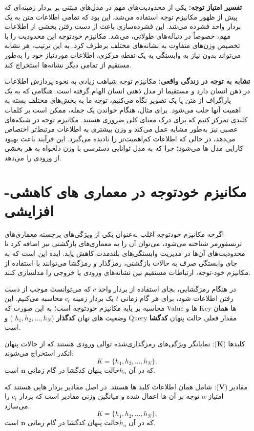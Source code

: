 \textbf{تفسیر امتیاز توجه:}  
یکی از محدودیت‌های مهم در مدل‌های مبتنی بر بردار زمینه‌ای که پیش از ظهور مکانیزم توجه استفاده می‌شد، این بود که تمامی اطلاعات متن به یک بردار واحد فشرده می‌شد. این فشرده‌سازی باعث از دست رفتن بخشی از اطلاعات مهم، خصوصاً در دنباله‌های طولانی، می‌شد. مکانیزم خودتوجه این محدودیت را با تخصیص وزن‌های متفاوت به نشانه‌های مختلف برطرف کرد. به این ترتیب، هر نشانه می‌تواند  بدون نیاز به وابستگی به یک نقطه مرکزی، اطلاعات موردنیاز خود را به‌طور مستقیم از تمامی دیگر نشانه‌ها استخراج کند‍. 

\textbf{تشابه به توجه در زندگی واقعی:}  
مکانیزم توجه شباهت زیادی به نحوه پردازش اطلاعات در ذهن انسان دارد و مستقیما از مدل ذهنی انسان الهام گرفته است. هنگامی که به یک پاراگراف از متن یا یک تصویر نگاه می‌کنیم، توجه ما به بخش‌های مختلف بسته به اهمیت آنها جلب می‌شود. برای مثال، هنگام خواندن یک جمله، ممکن است بر کلمات کلیدی تمرکز کنیم که برای درک معنای کلی ضروری هستند. مکانیزم توجه در شبکه‌های عصبی نیز به‌طور مشابه عمل می‌کند و وزن بیشتری به اطلاعات مرتبط‌تر اختصاص می‌دهد، در حالی که اطلاعات کم‌اهمیت‌تر را نادیده می‌گیرد. این فرآیند باعث بهبود کارایی مدل ها می‌شود؛ چرا که به مدل توانایی دسترسی با وزن دلخواه به هر بخشی از ورودی را می‌دهد.

\section{مکانیزم خودتوجه در معماری های کاهشی-افزایشی}
اگرچه مکانیزم خودتوجه اغلب به‌عنوان یکی از ویژگی‌های برجسته معماری‌های ترنسفورمر شناخته می‌شود، می‌توان آن را به معماری‌های بازگشتی نیز اضافه کرد تا محدودیت‌های آن‌ها در مدیریت وابستگی‌های بلندمدت کاهش یابد. ایده این است که به جای وابستگی صرف به حالات بازگشتی، رمزگذار و رمزگشا می‌توانند با استفاده از مکانیزم خود-توجه، ارتباطات مستقیم بین نشانه‌های ورودی یا خروجی را مدلسازی کنند.

در هنگام رمزگشایی‌، بجای استفاده از بردار واحد $c$ که می‌توانست موجب از دست رفتن اطلاعات شود،‌ برای هر گام زمانی $t$ یک بردار زمینه $c_t$ محاسبه می‌کنیم. این محاسبه بر پایه مکانیزم خودتوجه است؛ به این صورت که Value ها و Key ها همان وضعیت های نهان  \textbf{کدگذار} (${h_1, h_2, \dots, h_N}$ ) و Query مقدار فعلی حالت پنهان \textbf{کدگشا} است.

کلیدها ($\mathbf{K}$): نمایانگر ویژگی‌های رمزگذاری‌شده توالی ورودی هستند که از حالات پنهان انکدر استخراج می‌شوند: 
$$
K = \{h_1, h_2, \dots, h_N\},
$$
که در آن $ h_n $​ حالت پنهان کدگشا در گام زمانی $\mathbf{n}$ است.

مقادیر ($\mathbf{V}$): شامل همان اطلاعات کلید ها هستند. در اصل مقادیر بردار هایی هستند که امتیاز $\alpha$ توجه بر آن ها اعمال شده و میانگین وزنی مقادیر است که بردار $c_t$ را می‌سازد.
$$
K = \{h_1, h_2, \dots, h_N\},
$$
که در آن $ h_n $​ حالت پنهان کدگشا در گام زمانی $\mathbf{n}$ است.


